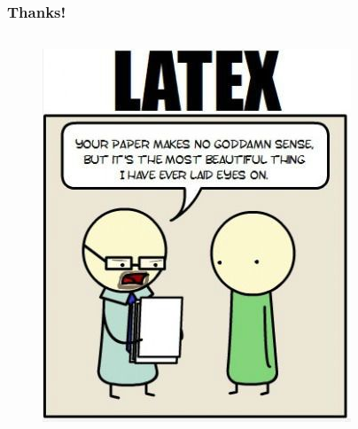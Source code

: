 \documentclass[compress]{beamer}
\begin{document}
    \begin{frame}[Basic2] \frametitle{Thanks!}
        \begin{columns}
            \begin{column}{0.5\textwidth}
                \vspace{7mm}
                
                \begin{figure}
                    \centering
                    \includegraphics[height=0.7\textheight]{../figures/programming-comic-latex}
                    \caption{}
                    \label{fig:programming-comic-latex}
                \end{figure}
            \end{column}
            \begin{column}{0.5\textwidth}
                \vspace{7mm}
                

\end{column}
\end{columns}
\end{frame}
\end{document}
